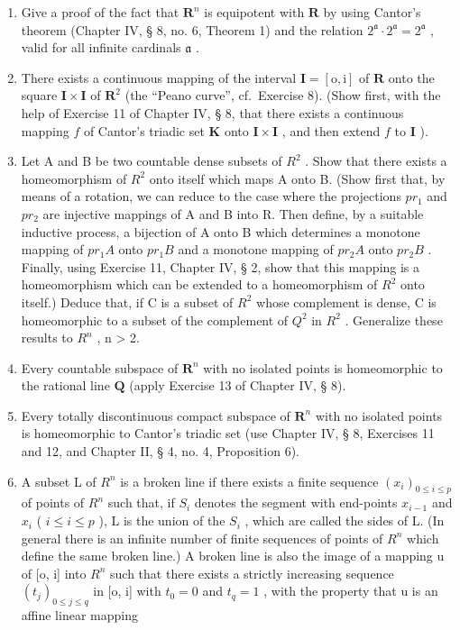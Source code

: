 \ExerciseGroupsStart
\ExerciseSection

\begin{enumerate}
\def\labelenumi{\arabic{enumi})}
\item
  Give a proof of the fact that \(\mathbf{R}^n\) is equipotent with \(\mathbf{R}\) by using Cantor's theorem (Chapter IV, § 8, no. 6, Theorem 1) and the relation \(2^{\mathfrak{a}} \cdot 2^{\mathfrak{a}} = 2^{\mathfrak{a}}\) , valid for all infinite cardinals \(\mathfrak{a}\) .
\item
  There exists a continuous mapping of the interval \(\mathbf{I} = [\mathrm{o},\mathrm{i}]\) of \(\mathbf{R}\) onto the square \(\mathbf{I}\times \mathbf{I}\) of \(\mathbf{R}^2\) (the ``Peano curve'', cf.~Exercise 8). (Show first, with the help of Exercise 11 of Chapter IV, § 8, that there exists a continuous mapping \(f\) of Cantor's triadic set \(\mathbf{K}\) onto \(\mathbf{I}\times \mathbf{I}\) , and then extend \(f\) to \(\mathbf{I}\) ).
\item
  Let A and B be two countable dense subsets of \(R^{2}\) . Show that there exists a homeomorphism of \(R^{2}\) onto itself which maps A onto B. (Show first that, by means of a rotation, we can reduce to the case where the projections \(pr_{1}\) and \(pr_{2}\) are injective mappings of A and B into R. Then define, by a suitable inductive process, a bijection of A onto B which determines a monotone mapping of \(pr_{1}A\) onto \(pr_{1}B\) and a monotone mapping of \(pr_{2}A\) onto \(pr_{2}B\) . Finally, using Exercise 11, Chapter IV, § 2, show that this mapping is a homeomorphism which can be extended to a homeomorphism of \(R^{2}\) onto itself.) Deduce that, if C is a subset of \(R^{2}\) whose complement is dense, C is homeomorphic to a subset of the complement of \(Q^{2}\) in \(R^{2}\) . Generalize these results to \(R^{n}\) , n \textgreater{} 2.
\item
  Every countable subspace of \(\mathbf{R}^n\) with no isolated points is homeomorphic to the rational line \(\mathbf{Q}\) (apply Exercise 13 of Chapter IV, § 8).
\item
  Every totally discontinuous compact subspace of \(\mathbf{R}^n\) with no isolated points is homeomorphic to Cantor's triadic set (use Chapter IV, § 8, Exercises 11 and 12, and Chapter II, § 4, no. 4, Proposition 6).
\item
  A subset L of \(R^{n}\) is a broken line if there exists a finite sequence \((x_{i})_{0\leqslant i\leqslant p}\) of points of \(R^{n}\) such that, if \(S_{i}\) denotes the segment with end-points \(x_{i-1}\) and \(x_{i}\) ( \(i\leqslant i\leqslant p\) ), L is the union of the \(S_{i}\) , which are called the sides of L. (In general there is an infinite number of finite sequences of points of \(R^{n}\) which define the same broken line.) A broken line is also the image of a mapping u of {[}o, i{]} into \(R^{n}\) such that there exists a strictly increasing sequence \((t_{j})_{0\leqslant j\leqslant q}\) in {[}o, i{]} with \(t_{0}=0\) and \(t_{q}=1\) , with the property that u is an affine linear mapping
\end{enumerate}

